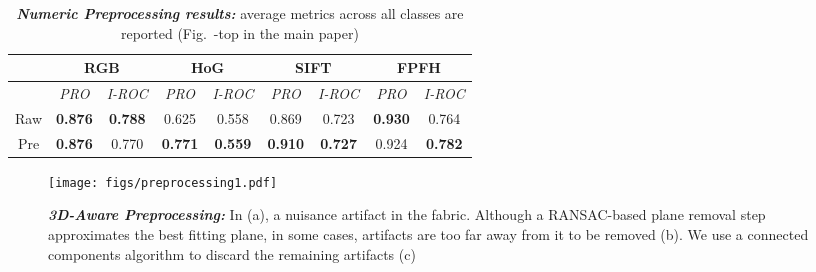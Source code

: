 \documentclass{article}
\begin{document}
 
\begin{table}[t]
\begin{center}
\caption{\textit{\textbf{Numeric Preprocessing results:}} average metrics across all classes are reported (Fig.~-top in the main paper)}
\label{table:preprocessing_ablation}
\begin{tabular}{c@{\hskip5pt}c@{\hskip5pt}c@{\hskip5pt}c@{\hskip5pt}c@{\hskip5pt}c@{\hskip5pt}c@{\hskip5pt}c@{\hskip5pt}c@{\hskip5pt}} 
    \toprule
    & \multicolumn{2}{c}{RGB}  & \multicolumn{2}{c}{HoG} & \multicolumn{2}{c}{SIFT} & \multicolumn{2}{c}{FPFH}  \\
    \midrule
    & \textit{PRO} & \textit{I-ROC} & \textit{PRO} & \textit{I-ROC} & \textit{PRO} & \textit{I-ROC} & \textit{PRO} & \textit{I-ROC}\\
    \cmidrule(r){2-2}
    \cmidrule(r){3-3}
    \cmidrule(r){4-4}
    \cmidrule(r){5-5}
    \cmidrule(r){6-6}
    \cmidrule(r){7-7}
    \cmidrule(r){8-8}
    \cmidrule(r){9-9}
    
    Raw & \textbf{0.876} & \textbf{0.788} & 0.625 & 0.558 & 0.869 & 0.723 & \textbf{0.930} & 0.764  \\
    Pre & \textbf{0.876} & 0.770 & \textbf{0.771} & \textbf{0.559} & \textbf{0.910} & \textbf{0.727} & 0.924 & \textbf{0.782}  \\
  \bottomrule
    \end{tabular}
\end{center}
\end{table}
 \begin{figure*}[t!]
    \centering
    \texttt{[image: figs/preprocessing1.pdf]}
    \caption{\textit{\textbf{3D-Aware Preprocessing:}} In (a), a nuisance artifact in the fabric. Although a RANSAC-based plane removal step approximates the best fitting plane, in some cases, artifacts are too far away from it to be removed (b). We use a connected components algorithm to discard the remaining artifacts (c)}
\label{fig:preprocessing}
\end{figure*}
 
\end{document}
